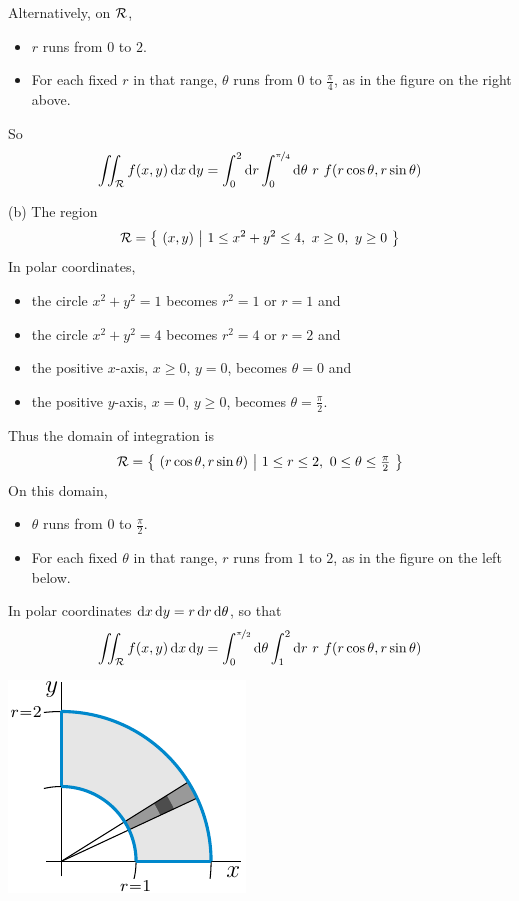 \begin{solution}
\begin{center}
\end{center}
Alternatively, on $\mathcal{R}$,
\begin{itemize}
\item 
$r$ runs from $0$ to $2$. 
\item
For each fixed $r$ in that range, $\theta$ runs from $0$ to $\frac{\pi}{4}$,
as in the figure on the right above.
\end{itemize}
So 
\begin{equation*}
\iint_{\mathcal{R}} f(x,y)\,\mathrm{d}x\,\mathrm{d}y
=\int_0^2\mathrm{d}r
  \int_0^{\nicefrac{\pi}{4}}\mathrm{d}\theta
 \ r\ f(r\cos\theta,r\sin\theta)
\end{equation*}


(b) The region 
\begin{equation*}
\mathcal{R}=\big\{ \ (x,y)\ \big|\ 1\le x^2+y^2\le 4,\ x\ge 0,\ y\ge 0\ \big\}
\end{equation*}
In polar coordinates, 
\begin{itemize}
\item
the circle $x^2+y^2=1$ becomes $r^2=1$ or $r=1$ and 
\item
the circle $x^2+y^2=4$ becomes $r^2=4$ or $r=2$ and 
\item
the positive $x$-axis, $x\ge0$, $y=0$,  becomes $\theta=0$ and
\item
the positive $y$-axis, $x=0$, $y\ge0$,  becomes $\theta=\frac{\pi}{2}$. 
\end{itemize}
Thus the domain of integration is
\begin{equation*}
\cR=\Set{(r\cos\theta,r\sin\theta)}{1\le r\le 2,\ 0\le\theta\le\tfrac{\pi}{2}}
\end{equation*}
On this domain,
\begin{itemize}
\item 
$\theta$ runs from $0$ to $\frac{\pi}{2}$. 
\item
For each fixed $\theta$ in that range, $r$ runs from $1$ to $2$, 
as in the figure on the left below.
\end{itemize}
In polar coordinates $\mathrm{d}x\,\mathrm{d}y = r\,\mathrm{d}r\,\mathrm{d}\theta$, so that
\begin{equation*}
\iint_{\mathcal{R}} f(x,y)\,\mathrm{d}x\,\mathrm{d}y
=\int_0^{\nicefrac{\pi}{2}}\mathrm{d}\theta
 \int_1^2\mathrm{d}r\ r\ f(r\cos\theta,r\sin\theta)
\end{equation*}
\begin{center}
     \includegraphics{fig/polar5b2.pdf}\qquad\qquad

\end{center}
\end{solution}
